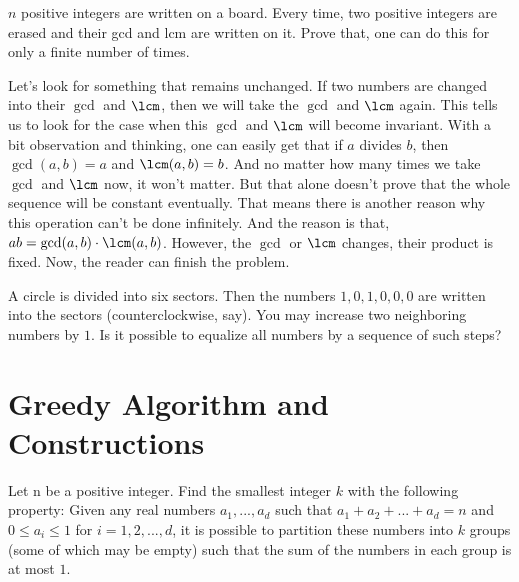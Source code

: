 \documentclass[nt_billal_v1.tex]{subfile}
\begin{document}
\begin{problem}
	$n$ positive integers are written on a board. Every time, two positive integers are erased and their gcd and lcm are written on it. Prove that, one can do this for only a finite number of times.
\end{problem}

\begin{solution}
	Let's look for something that remains unchanged. If two numbers are changed into their $\gcd$ and $\lcm$, then we will take the $\gcd$ and $\lcm$ again. This tells us to look for the case when this $\gcd$ and $\lcm$ will become invariant. With a bit observation and thinking, one can easily get that if $a$ divides $b$, then $\gcd(a,b)=a$ and $\lcm(a,b)=b$. And no matter how many times we take $\gcd$ and $\lcm$ now, it won't matter. But that alone doesn't prove that the whole sequence will be constant eventually. That means there is another reason why this operation can't be done infinitely. And the reason is that, $ab=\gcd(a,b)\cdot\lcm(a,b)$. However, the $\gcd$ or $\lcm$ changes, their product is fixed. Now, the reader can finish the problem.
\end{solution}

\begin{problem}
	A circle is divided into six sectors. Then the numbers $1, 0, 1, 0, 0, 0$ are written into the sectors (counterclockwise, say). You may increase two neighboring numbers by $1$. Is it possible to equalize all numbers by a sequence of such steps?
\end{problem}

\begin{solution}
	
\end{solution}




\section{Greedy Algorithm and Constructions}

\begin{problem}
	Let n be a positive integer. Find the smallest integer $k$ with the following property: Given any real numbers $a_1,..., a_d$ such that $a_1 + a_2+...+a_d =n$ and $0\leq a_i\leq 1$ for $i = 1, 2, . . . , d$, it is possible to partition these numbers into $k$ groups (some of which may be empty) such that the sum of the numbers in each group is at most $1$.
\end{problem}
\end{document}
